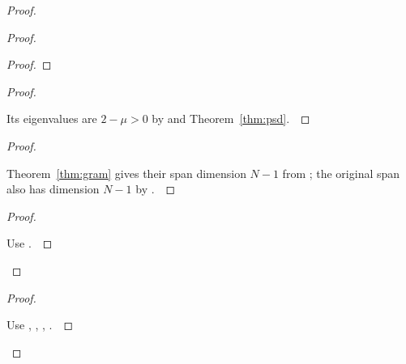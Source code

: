 \documentclass[11pt]{amsart}
\let\qed\relax
\theoremstyle{definition}
\begin{document}
\begin{proof}
\begin{proof}
\begin{proof}
\end{proof}
\begin{proof}
\pf\ \raggedright Its eigenvalues are $2-\mu>0$ by  and Theorem~\ref{thm:psd}.~\qed
\end{proof}
\begin{proof}
\pf\ \raggedright Theorem~\ref{thm:gram} gives their span dimension $N-1$ from ; the original span also has dimension $N-1$ by .~\qed
\end{proof}
\qedstep
\begin{proof}
\pf\ \raggedright Use .~\qed
\end{proof}
\end{proof}
\qedstep
\begin{proof}
\pf\ \raggedright Use , , , .~\qed
\end{proof}
\end{proof}
\end{document}
